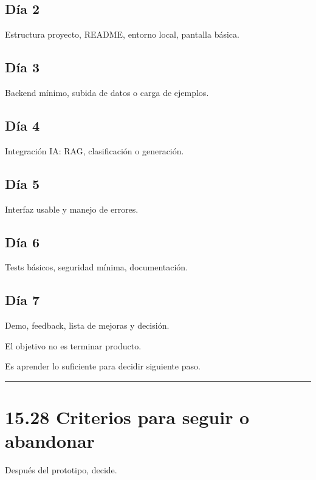 \subsection{Día 2}\label{duxeda-2}

Estructura proyecto, README, entorno local, pantalla básica.

\subsection{Día 3}\label{duxeda-3}

Backend mínimo, subida de datos o carga de ejemplos.

\subsection{Día 4}\label{duxeda-4}

Integración IA: RAG, clasificación o generación.

\subsection{Día 5}\label{duxeda-5}

Interfaz usable y manejo de errores.

\subsection{Día 6}\label{duxeda-6}

Tests básicos, seguridad mínima, documentación.

\subsection{Día 7}\label{duxeda-7}

Demo, feedback, lista de mejoras y decisión.

El objetivo no es terminar producto.

Es aprender lo suficiente para decidir siguiente paso.

\begin{center}\rule{0.5\linewidth}{0.5pt}\end{center}

\section{15.28 Criterios para seguir o
abandonar}\label{criterios-para-seguir-o-abandonar}

Después del prototipo, decide.

